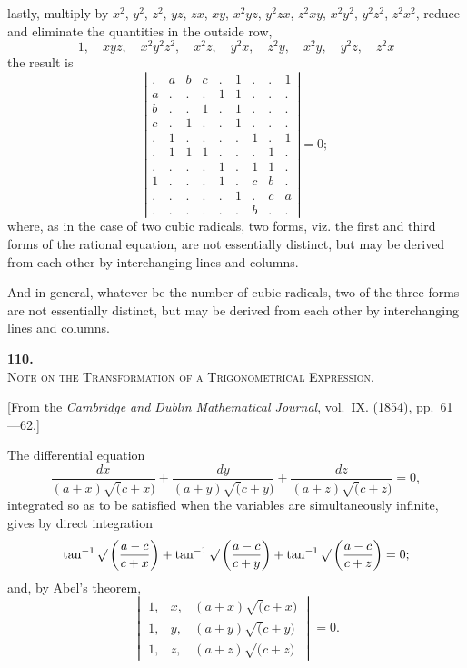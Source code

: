 \documentclass[11pt]{article}
\begin{document}
lastly, multiply by $x^2$, $y^2$, $z^2$, $yz$, $zx$, $xy$, $x^2yz$, $y^2zx$, $z^2xy$, $x^2y^2$, $y^2z^2$, $z^2x^2$, reduce and eliminate the quantities in the outside row,
\[
1, \quad xyz, \quad x^2y^2z^2, \quad x^2z, \quad y^2x, \quad z^2y, \quad x^2y, \quad y^2z, \quad z^2x
\]
the result is
\[
\left|\begin{array}{ccc|ccc|ccc}
. & a & b & c & . & 1 & . & . & 1 \\
a & . & . & . & 1 & 1 & . & . & . \\
b & . & . & 1 & . & 1 & . & . & . \\
c & . & 1 & . & . & 1 & . & . & . \\
\hline
. & 1 & . & . & . & . & 1 & . & 1 \\
. & 1 & 1 & 1 & . & . & . & 1 & . \\
. & . & . & . & 1 & . & 1 & 1 & . \\
\hline
1 & . & . & . & 1 & . & c & b & . \\
. & . & . & . & . & 1 & . & c & a \\
. & . & . & . & . & . & b & . & .
\end{array}\right| = 0;
\]
where, as in the case of two cubic radicals, two forms, viz. the first and third forms of the rational equation, are not essentially distinct, but may be derived from each other by interchanging lines and columns.

And in general, whatever be the number of cubic radicals, two of the three forms are not essentially distinct, but may be derived from each other by interchanging lines and columns.


\newpage
\setcounter{page}{45}

\begin{center}
{\Large\bfseries 110.}\\[0.5em]
{\large\scshape Note on the Transformation of a Trigonometrical Expression.}
\end{center}
\vspace{0.3em}
\begin{center}
\small [From the \textit{Cambridge and Dublin Mathematical Journal}, vol.~IX. (1854), pp.~61---62.]
\end{center}
\vspace{0.5em}

The differential equation
\[
\frac{dx}{(a+x)\surd(c+x)} + \frac{dy}{(a+y)\surd(c+y)} + \frac{dz}{(a+z)\surd(c+z)} = 0,
\]
integrated so as to be satisfied when the variables are simultaneously infinite, gives by direct integration
\[
\tan^{-1}\surd\left(\frac{a-c}{c+x}\right) + \tan^{-1}\surd\left(\frac{a-c}{c+y}\right) + \tan^{-1}\surd\left(\frac{a-c}{c+z}\right) = 0;
\]
and, by Abel's theorem,
\[
\begin{vmatrix}
1, & x, & (a+x)\surd(c+x) \\
1, & y, & (a+y)\surd(c+y) \\
1, & z, & (a+z)\surd(c+z)
\end{vmatrix} = 0.
\]
\end{document}
